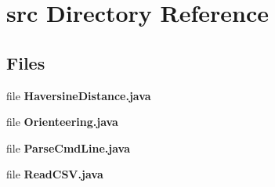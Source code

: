 \section{src Directory Reference}
\label{dir_68267d1309a1af8e8297ef4c3efbcdba}
\subsection*{Files}
\begin{DoxyCompactItemize}
\item 
file \textbf{ Haversine\+Distance.\+java}
\item 
file \textbf{ Orienteering.\+java}
\item 
file \textbf{ Parse\+Cmd\+Line.\+java}
\item 
file \textbf{ Read\+C\+S\+V.\+java}
\end{DoxyCompactItemize}

